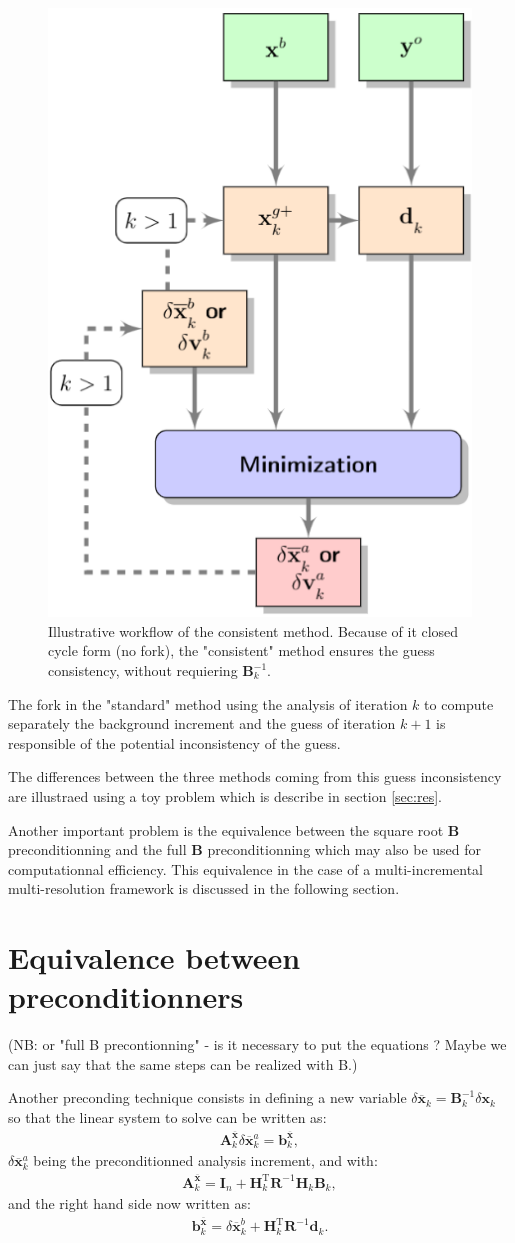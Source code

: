 \documentclass[npg, manuscript]{copernicus}
\begin{document}
\begin{figure}[H]
 \begin{center}
  \includegraphics[width=0.3\linewidth]{fig/cst.png}
  \caption{\label{fig03} Illustrative workflow of the consistent method. Because of it closed cycle form (no fork), the "consistent" method ensures the guess consistency, without requiering $\mathbf{B}_k^{-1}$.}
 \end{center}
\end{figure}

The fork in the "standard" method using the analysis of iteration $k$ to compute separately the background increment and the guess of iteration $k+1$ is responsible of the potential inconsistency of the guess. 

The differences between the three methods coming from this guess inconsistency are illustraed using a toy problem which is describe in section \ref{sec:res}.

Another important problem is the equivalence between the square root $\mathbf{B}$ preconditionning and the full $\mathbf{B}$ preconditionning which may also be used for computationnal efficiency. This equivalence in the case of a multi-incremental multi-resolution framework is discussed in the following section.


\section{Equivalence between preconditionners}
(NB: or "full B precontionning" - is it necessary to put the equations ? Maybe we can just say that the same steps can be realized with B.)

Another preconding technique consists in defining a new variable $\delta \overline{\mathbf{x}}_k = \mathbf{B}_k^{-1} \delta \mathbf{x}_k$ so that the linear system to solve can be written as:
\begin{align}
 \mathbf{A}^{\overline{\mathbf{x}}}_k \delta \overline{\mathbf{x}}^a_k = \mathbf{b}^{\overline{\mathbf{x}}}_k,
\end{align}
 $\delta \overline{\mathbf{x}}^a_k$ being the preconditionned analysis increment, and with:
 \begin{align}
  \mathbf{A}^{\overline{\mathbf{x}}}_k = \mathbf{I}_n + \mathbf{H}_k^\mathrm{T} \mathbf{R}^{-1} \mathbf{H}_k \mathbf{B}_k,
 \end{align}
 and the right hand side now written as:
 \begin{align}
  \mathbf{b}^{\overline{\mathbf{x}}}_k =  \delta \overline{\mathbf{x}}^b_k + \mathbf{H}_k^\mathrm{T} \mathbf{R}^{-1} \mathbf{d}_k.
 \end{align}
 
\end{document}
